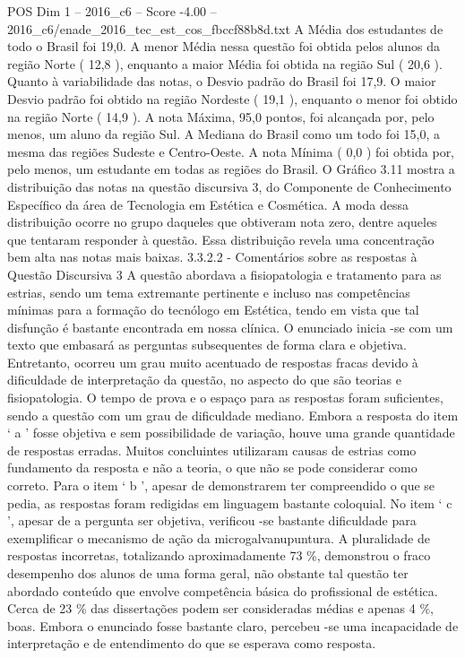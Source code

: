\begin{textsample}{POS Dim 1 – 2016\_c6 – Score -4.00 – 2016\_c6/enade\_2016\_tec\_est\_cos\_fbccf88b8d.txt}
A Média dos estudantes de todo o Brasil foi 19,0.
A menor Média nessa questão foi obtida pelos alunos da região Norte ( 12,8 ), enquanto a maior Média foi obtida na região Sul ( 20,6 ).
Quanto à variabilidade das notas, o Desvio padrão do Brasil foi 17,9.
O maior Desvio padrão foi obtido na região Nordeste ( 19,1 ), enquanto o menor foi obtido na região Norte ( 14,9 ).
A nota Máxima, 95,0 pontos, foi alcançada por, pelo menos, um aluno da região Sul.
A Mediana do Brasil como um todo foi 15,0, a mesma das regiões Sudeste e Centro-Oeste.
A nota Mínima ( 0,0 ) foi obtida por, pelo menos, um estudante em todas as regiões do Brasil.
O Gráfico 3.11 mostra a distribuição das notas na questão discursiva 3, do Componente de Conhecimento Específico da área de Tecnologia em Estética e Cosmética.
A moda dessa distribuição ocorre no grupo daqueles que obtiveram nota zero, dentre aqueles que tentaram responder à questão.
Essa distribuição revela uma concentração bem alta nas notas mais baixas. 3.3.2.2 - Comentários sobre as respostas à Questão Discursiva 3 A questão abordava a fisiopatologia e tratamento para as estrias, sendo um tema extremante pertinente e incluso nas competências mínimas para a formação do tecnólogo em Estética, tendo em vista que tal disfunção é bastante encontrada em nossa clínica.
O enunciado inicia -se com um texto que embasará as perguntas subsequentes de forma clara e objetiva.
Entretanto, ocorreu um grau muito acentuado de respostas fracas devido à dificuldade de interpretação da questão, no aspecto do que são teorias e fisiopatologia.
O tempo de prova e o espaço para as respostas foram suficientes, sendo a questão com um grau de dificuldade mediano.
Embora a resposta do item ‘ a ’ fosse objetiva e sem possibilidade de variação, houve uma grande quantidade de respostas erradas.
Muitos concluintes utilizaram causas de estrias como fundamento da resposta e não a teoria, o que não se pode considerar como correto.
Para o item ‘ b ’, apesar de demonstrarem ter compreendido o que se pedia, as respostas foram redigidas em linguagem bastante coloquial.
No item ‘ c ’, apesar de a pergunta ser objetiva, verificou -se bastante dificuldade para exemplificar o mecanismo de ação da microgalvanupuntura.
A pluralidade de respostas incorretas, totalizando aproximadamente 73 \%, demonstrou o fraco desempenho dos alunos de uma forma geral, não obstante tal questão ter abordado conteúdo que envolve competência básica do profissional de estética.
Cerca de 23 \% das dissertações podem ser consideradas médias e apenas 4 \%, boas.
Embora o enunciado fosse bastante claro, percebeu -se uma incapacidade de interpretação e de entendimento do que se esperava como resposta.

\end{textsample}
